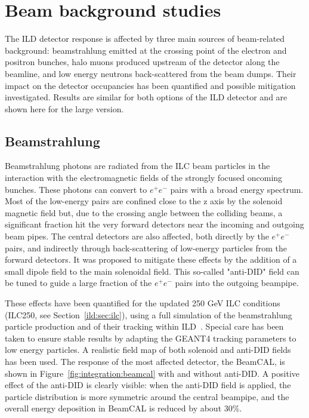 \section{\label{sec:beam:background} Beam background studies}
\label{ild:sec:beam_backgrounds}
The ILD detector response is affected by three main sources of beam-related background: beamstrahlung emitted at the crossing point of the electron and positron bunches, halo muons produced upstream of the detector along the beamline, and low energy neutrons back-scattered from the beam dumps. Their impact on the detector occupancies has been quantified and possible mitigation investigated\cite{ild:bib:Machine_Backgrounds,ild:bib:schuetz_thesis}. Results are similar for both options of the ILD detector and are shown here for the large version.

\subsection{Beamstrahlung}

Beamstrahlung photons are radiated from the ILC beam particles in the interaction with the electromagnetic fields of the strongly focused oncoming bunches. These photons can convert to $e^+e^-$ pairs with a broad energy spectrum. Most of the low-energy pairs are confined close to the z axis by the solenoid magnetic field but, due to the crossing angle between the colliding beams, a significant fraction hit the very forward detectors near the incoming and outgoing beam pipes. The central detectors are also affected, both directly by the $e^+e^-$ pairs, and indirectly through back-scattering of low-energy particles from the forward detectors. It was proposed to mitigate these effects by the addition of a small dipole field to the main solenoidal field. This so-called "anti-DID" field can be tuned to guide a large fraction of the  $e^+e^-$ pairs into the outgoing beampipe. 

These effects have been quantified for the updated 250 GeV ILC conditions (ILC250, see Section~\ref{ild:sec:ilc}), using a full simulation of the beamstrahlung particle production and of their tracking within ILD~\cite{ild:bib:Machine_Backgrounds}. Special care has been taken to ensure stable results by adapting the GEANT4 tracking parameters to low energy particles. A realistic field map of both solenoid and anti-DID fields has been used. The response of the most affected detector, the BeamCAL, is shown in Figure~\ref{fig:integration:beamcal} with and without anti-DID. A positive effect of the anti-DID is clearly visible: when the anti-DID field is applied, the particle distribution is more symmetric around the central beampipe, and the overall energy deposition in BeamCAL is reduced by about 30\%.

